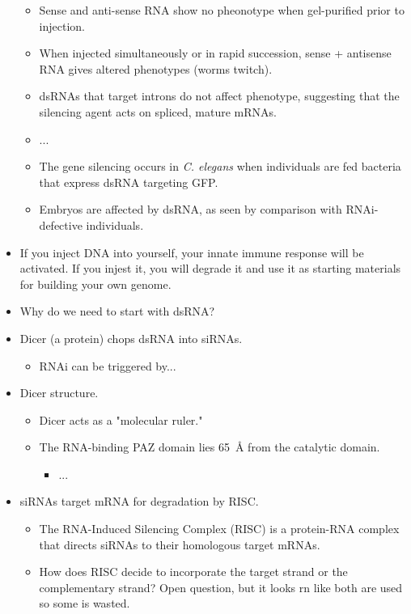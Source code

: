 \documentclass[../notes.tex]{subfiles}
\begin{document}
\begin{itemize}
\begin{itemize}
        \item Sense and anti-sense RNA show no pheonotype when gel-purified prior to injection.
        \item When injected simultaneously or in rapid succession, sense + antisense RNA gives altered phenotypes (worms twitch).
        \item dsRNAs that target introns do not affect phenotype, suggesting that the silencing agent acts on spliced, mature mRNAs.
        \item ...
        \item The gene silencing occurs in \emph{C. elegans} when individuals are fed bacteria that express dsRNA targeting GFP.
        \item Embryos are affected by dsRNA, as seen by comparison with RNAi-defective individuals.
    \end{itemize}
    \item If you inject DNA into yourself, your innate immune response will be activated. If you injest it, you will degrade it and use it as starting materials for building your own genome.
    \item Why do we need to start with dsRNA?
    \item Dicer (a protein) chops dsRNA into siRNAs.
    \begin{itemize}
        \item RNAi can be triggered by...
    \end{itemize}
    \item Dicer structure.
    \begin{itemize}
        \item Dicer acts as a "molecular ruler."
        \item The RNA-binding PAZ domain lies \SI{65}{\angstrom} from the catalytic domain.
        \begin{itemize}
            \item ...
        \end{itemize}
    \end{itemize}
    \item siRNAs target mRNA for degradation by RISC.
    \begin{itemize}
        \item The RNA-Induced Silencing Complex (RISC) is a protein-RNA complex that directs siRNAs to their homologous target mRNAs.
        \item How does RISC decide to incorporate the target strand or the complementary strand? Open question, but it looks rn like both are used so some is wasted.

\end{itemize}
\end{itemize}
\end{document}
